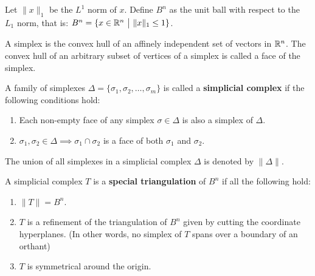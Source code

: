 Let $\|x\|_1$ be the $L^1$ norm of $x$. Define $B^n$ as the unit ball with respect to the $L_1$ norm, 
that is: $B^n = \{x\in \RR^n \ \big | \ \|x\|_1 \leq 1 \}$.
\begin{definition}
    A simplex is the convex hull of an affinely independent set of vectors in $\mathbb R^n$. The convex hull of an arbitrary subset of vertices of a simplex is called a face of the simplex.

    A family of simplexes $\Delta = \{\sigma_1,\sigma_2, \dots, \sigma_m\}$ is called a \textbf{simplicial complex} if the following conditions hold:
    \begin{enumerate}
        \item Each non-empty face of any simplex $\sigma \in \Delta$ is also a simplex of $\Delta$.
        \item $\sigma_1, \sigma_2 \in \Delta \implies \sigma_1 \cap \sigma_2$ is a face of both $\sigma_1$ and $\sigma_2$.
    \end{enumerate}
    The union of all simplexes in a simplicial complex $\Delta$ is denoted by $\| \Delta \|$.
\end{definition}


A simplicial complex $T$ is a \textbf{special triangulation} of $B^n$ if all the following hold:
\begin{enumerate}
    \item $\|T\| = B^n$.
    \item $T$ is a refinement of the triangulation of $B^n$ given by cutting the coordinate hyperplanes. (In other words, no simplex of $T$ spans over a boundary of an orthant)
    \item $T$ is symmetrical around the origin.
\end{enumerate}

